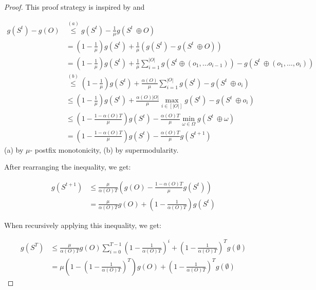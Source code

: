 \documentclass{article} %
\begin{document}
\begin{proof}

This proof strategy is inspired by \citet{streeter2008online} and \citet{liberty2017greedy}

\begin{align*}
    g(S^t) -g(O) &\overset{(a)}{\leq} g(S^t) - \frac{1}{\mu}g(S^t\ \oplus O) \\
    &= \left(1 - \frac{1}{\mu}\right)g(S^t) + \frac{1}{\mu}\left(g(S^t) - g(S^t\ \oplus O)\right) \\
    &=\left(1 - \frac{1}{\mu}\right)g(S^t) + \frac{1}{\mu}\sum_{i = 1}^{|O|} g(S^t \oplus \left(o_1, \dots o_{i - 1}\right)) -g(S^t\ \oplus \left(o_1, \dots, o_{i}\right))\\
    &\overset{(b)}{\leq} \left(1 - \frac{1}{\mu}\right)g(S^t) + \frac{\alpha(O)}{\mu}\sum_{i = 1}^{|O|} g(S^t) -g(S^t\ \oplus  o_{i}) \\
    &\leq \left(1 - \frac{1}{\mu}\right)g(S^t) + \frac{\alpha(O)|O|}{\mu}\max_{i \in [|O|]} g(S^t) -g(S^t\ \oplus  o_{i}) \\
    &\leq  \left(1 - \frac{1 - \alpha(O) T}{\mu}\right)g(S^t) -  \frac{\alpha(O) T}{\mu}\min_{\omega \in \Omega} g(S^t\ \oplus  \omega) \\
    &=  \left(1 - \frac{1 - \alpha(O) T}{\mu}\right)g(S^t) -  \frac{\alpha(O) T}{\mu}g(S^{t + 1})
\end{align*}
(a) by $\mu$- postfix monotonicity, (b) by supermodularity. 

After rearranging the inequality, we get:

\begin{align*}
    g(S^{t + 1}) &\leq \frac{\mu}{\alpha(O) T}\left(g(O) -  \frac{1 - \alpha(O) T}{\mu}g(S^t)\right) \\
    &= \frac{\mu}{\alpha(O) T}g(O) + \left(1 - \frac{1}{\alpha(O) T}\right)g(S^t)
\end{align*}

When recursively applying this inequality, we get:

\begin{align*}
     g(S^{T}) &\leq \frac{\mu}{\alpha(O) T}g(O)\sum_{i = 0}^{T - 1}\left(1 - \frac{1}{\alpha(O) T}\right)^i + \left(1 - \frac{1}{\alpha(O) T}\right)^Tg(\emptyset) \\
     &= \mu \left(1 - \left(1 - \frac{1}{\alpha(O) T}\right)^T\right)g(O) + \left(1 - \frac{1}{\alpha(O) T}\right)^Tg(\emptyset)
\end{align*}
\end{proof}
\end{document}
